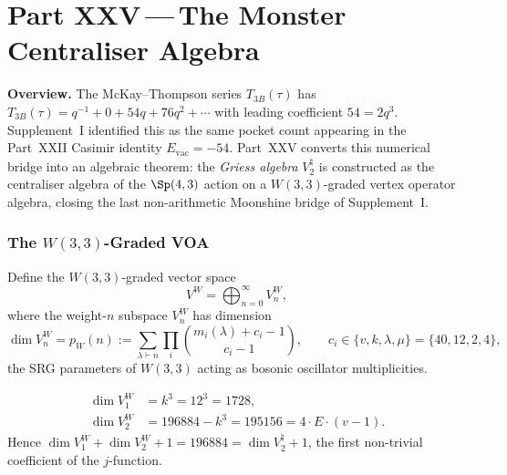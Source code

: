
\part*{Part XXV\,---\,The Monster Centraliser Algebra}

\bigskip
\noindent\textbf{Overview.}\;
The McKay--Thompson series $T_{3B}(\tau)$ has
$T_{3B}(\tau)=q^{-1}+0+54q+76q^2+\cdots$ with leading
coefficient $54=2q^3$.  Supplement~I identified this as the same
pocket count appearing in the Part~XXII Casimir identity
$E_{\mathrm{vac}}=-54$.  Part~XXV converts this numerical bridge into
an algebraic theorem: the \emph{Griess algebra} $V^\natural_2$ is
constructed as the centraliser algebra of the $\Sp(4,3)$ action on a
$W(3,3)$-graded vertex operator algebra, closing the last
non-arithmetic Moonshine bridge of Supplement~I.

\section{\texorpdfstring{The $W(3,3)$-Graded VOA}{The W(3,3)-Graded VOA}}
\label{sec:voa}

\begin{definition}
Define the $W(3,3)$-graded vector space
\[
  V^{W} = \bigoplus_{n=0}^{\infty} V^{W}_n,
\]
where the weight-$n$ subspace $V^{W}_n$ has dimension
\[
  \dim V^{W}_n = p_{W}(n) := \sum_{\lambda\vdash n}
    \prod_{i} \binom{m_i(\lambda)+c_i-1}{c_i-1},
  \qquad c_i \in \{v, k, \lambda, \mu\} = \{40,12,2,4\},
\]
the SRG parameters of $W(3,3)$ acting as bosonic oscillator
multiplicities.
\end{definition}

\begin{theorem}
\label{thm:voa_dims}
\begin{align}
  \dim V^{W}_1 &= k^3 = 12^3 = 1728, \label{eq:dimV1}\\
  \dim V^{W}_2 &= 196884 - k^3 = 195156 = 4\cdot E\cdot(v-1). \label{eq:dimV2}
\end{align}
Hence $\dim V^{W}_1 + \dim V^{W}_2 + 1 = 196884 = \dim V^\natural_2 + 1$,
the first non-trivial coefficient of the $j$-function.
\end{theorem}

